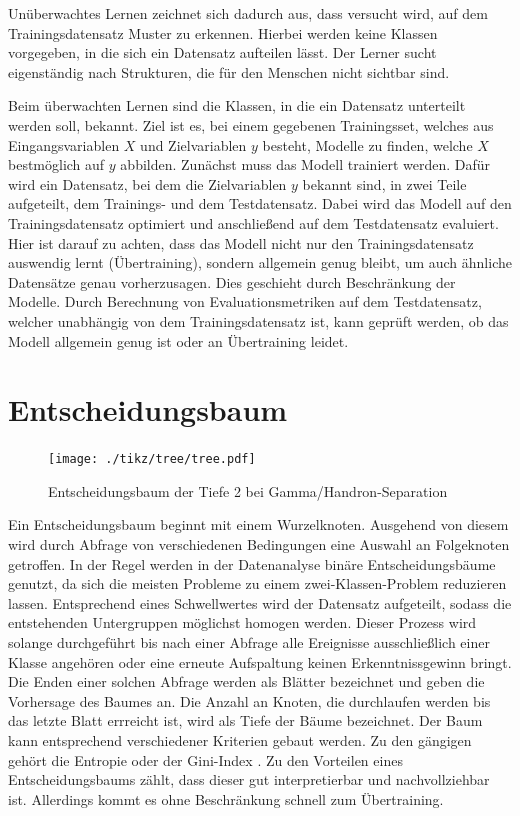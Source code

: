 Unüberwachtes Lernen zeichnet sich dadurch aus, dass versucht wird, auf dem Trainingsdatensatz Muster zu erkennen. 
Hierbei werden keine Klassen vorgegeben, in die sich ein Datensatz aufteilen lässt. 
Der Lerner sucht eigenständig nach Strukturen, die für den Menschen nicht sichtbar sind.

Beim überwachten Lernen sind die Klassen, in die ein Datensatz unterteilt werden soll, bekannt.
Ziel ist es, bei einem gegebenen Trainingsset, welches aus Eingangsvariablen $X$ und Zielvariablen $y$ besteht, Modelle zu finden, welche $X$ bestmöglich auf $y$ abbilden. 
Zunächst muss das Modell trainiert werden. 
Dafür wird ein Datensatz, bei dem die Zielvariablen $y$ bekannt sind, in zwei Teile aufgeteilt, dem Trainings- und dem Testdatensatz. 
Dabei wird das Modell auf den Trainingsdatensatz optimiert und anschließend auf dem Testdatensatz evaluiert. 
Hier ist darauf zu achten, dass das Modell nicht nur den Trainingsdatensatz auswendig lernt (Übertraining), sondern allgemein genug bleibt, um auch ähnliche Datensätze genau vorherzusagen. 
Dies geschieht durch Beschränkung der Modelle. 
Durch Berechnung von Evaluationsmetriken auf dem Testdatensatz, welcher unabhängig von dem Trainingsdatensatz ist, kann geprüft werden, ob das Modell allgemein genug ist oder an Übertraining leidet.
\section{Entscheidungsbaum}
\begin{figure}
  \centering
  \texttt{[image: ./tikz/tree/tree.pdf]}
  \caption{Entscheidungsbaum der Tiefe 2 bei Gamma/Handron-Separation}
\end{figure}
Ein Entscheidungsbaum beginnt mit einem Wurzelknoten. Ausgehend von diesem wird durch Abfrage von verschiedenen Bedingungen eine Auswahl an Folgeknoten getroffen. 
In der Regel werden in der Datenanalyse binäre Entscheidungsbäume genutzt, da sich die meisten Probleme zu einem zwei-Klassen-Problem reduzieren lassen.
Entsprechend eines Schwellwertes wird der Datensatz aufgeteilt, sodass die entstehenden Untergruppen möglichst homogen werden. 
Dieser Prozess wird solange durchgeführt bis nach einer Abfrage alle Ereignisse ausschließlich einer Klasse angehören oder eine erneute Aufspaltung keinen Erkenntnissgewinn bringt. Die Enden einer solchen Abfrage werden als Blätter bezeichnet und geben die Vorhersage des Baumes an.
Die Anzahl an Knoten, die durchlaufen werden bis das letzte Blatt errreicht ist, wird als Tiefe der Bäume bezeichnet.
Der Baum kann entsprechend verschiedener Kriterien gebaut werden.
Zu den gängigen gehört die Entropie oder der Gini-Index \cite{model}. 
Zu den Vorteilen eines Entscheidungsbaums zählt, dass dieser gut interpretierbar und nachvollziehbar ist. 
Allerdings kommt es ohne Beschränkung schnell zum Übertraining.
